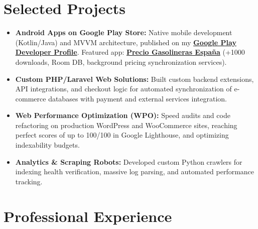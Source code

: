 \documentclass[10pt,a4paper]{article}
\begin{document}
\section{Selected Projects}
\begin{itemize}
  \item \textbf{Android Apps on Google Play Store:} Native mobile development (Kotlin/Java) and MVVM architecture, published on my \href{https://play.google.com/store/apps/dev?id=4633874941646419208}{\textbf{Google Play Developer Profile}}. Featured app: \href{https://play.google.com/store/apps/details?id=com.walkiriaapps.topgasolineras}{\textbf{Precio Gasolineras España}} (+1000 downloads, Room DB, background pricing synchronization services).
  \item \textbf{Custom PHP/Laravel Web Solutions:} Built custom backend extensions, API integrations, and checkout logic for automated synchronization of e-commerce databases with payment and external services integration.
  \item \textbf{Web Performance Optimization (WPO):} Speed audits and code refactoring on production WordPress and WooCommerce sites, reaching perfect scores of up to 100/100 in Google Lighthouse, and optimizing indexability budgets.
  \item \textbf{Analytics \& Scraping Robots:} Developed custom Python crawlers for indexing health verification, massive log parsing, and automated performance tracking.
\end{itemize}

\section{Professional Experience}

\end{document}
